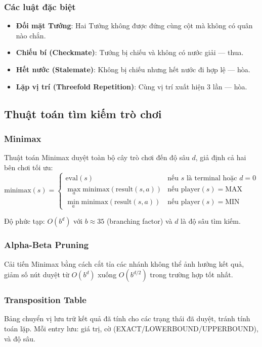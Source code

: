 \subsubsection{Các luật đặc biệt}
\begin{itemize}
    \item \textbf{Đối mặt Tướng}: Hai Tướng không được đứng cùng cột mà không có quân nào chắn.
    \item \textbf{Chiếu bí (Checkmate)}: Tướng bị chiếu và không có nước giải --- thua.
    \item \textbf{Hết nước (Stalemate)}: Không bị chiếu nhưng hết nước đi hợp lệ --- hòa.
    \item \textbf{Lặp vị trí (Threefold Repetition)}: Cùng vị trí xuất hiện 3 lần --- hòa.
\end{itemize}

\subsection{Thuật toán tìm kiếm trò chơi}

\subsubsection{Minimax}
Thuật toán Minimax duyệt toàn bộ cây trò chơi đến độ sâu $d$, giả định cả hai bên chơi tối ưu:
\begin{equation}
    \text{minimax}(s) = \begin{cases}
        \text{eval}(s) & \text{nếu } s \text{ là terminal hoặc } d = 0 \\
        \max_{a} \text{minimax}(\text{result}(s, a)) & \text{nếu player}(s) = \text{MAX} \\
        \min_{a} \text{minimax}(\text{result}(s, a)) & \text{nếu player}(s) = \text{MIN}
    \end{cases}
\end{equation}

Độ phức tạp: $O(b^d)$ với $b \approx 35$ (branching factor) và $d$ là độ sâu tìm kiếm.

\subsubsection{Alpha-Beta Pruning}
Cải tiến Minimax bằng cách cắt tỉa các nhánh không thể ảnh hưởng kết quả, giảm số nút duyệt từ $O(b^d)$ xuống $O(b^{d/2})$ trong trường hợp tốt nhất.

\subsubsection{Transposition Table}
Bảng chuyển vị lưu trữ kết quả đã tính cho các trạng thái đã duyệt, tránh tính toán lặp. Mỗi entry lưu: giá trị, cờ (EXACT/LOWERBOUND/UPPERBOUND), và độ sâu.

